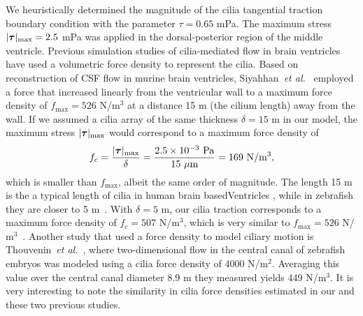 \documentclass{WileyMSP-template}
\begin{document}
We heuristically determined the magnitude of the cilia tangential traction boundary condition
with the parameter $\tau = 0.65$ mPa. The maximum stress $\vert\bm{\tau}\vert_{\mathrm{max}} = 2.5$ mPa
was applied in the dorsal-posterior region of the middle ventricle.
Previous simulation studies of cilia-mediated flow in brain ventricles have
used a volumetric force density to represent the cilia.
Based on reconstruction of CSF flow in murine brain ventricles,
Siyahhan~\emph{et al.}~\cite{Siyahhan2014FlowVentricles}
employed a force that increased linearly from the ventricular wall to a maximum force density of
$f_{\mathrm{max}} = 526$ N/$\mathrm{m^3}$ at a distance 15 \textmu m (the cilium length)
away from the wall. If we assumed a cilia array of the same thickness
$\delta = 15$ \textmu m in our model, the maximum stress $\vert\bm{\tau}\vert_{\mathrm{max}}$
would correspond to a maximum force density of 
\begin{equation*}
    f_c = \frac{\vert\bm{\tau}\vert_{\mathrm{max}}}{\delta}
        = \frac{\num{2.5e-3} \ \mathrm{Pa}}{15 \ \mu\mathrm{m}}
        = 169 \ \mathrm{N/m^3},
\end{equation*}
which is smaller than $f_{\mathrm{max}}$, albeit the same order of magnitude.
The length 15 \textmu m is the a typical length of cilia in human brain basedVentricles
\cite{Afzelius2004CiliaRelatedDiseases, Siyahhan2014FlowVentricles},
while in zebrafish they are closer to 5 \textmu m~\cite{Olstad2019CiliaryDevelopment,
Salman2022ComputationalEmbryo, Ringers2023NovelEpithelia}.
With $\delta=5$ \textmu m, our cilia traction corresponds to a maximum force density of
$f_c=507$ N/$\mathrm{m^3}$, which is very similar to
$f_{\mathrm{max}} = 526$ N/$\mathrm{m^3}$~\cite{Siyahhan2014FlowVentricles}.
Another study that used a force density to model ciliary motion is
Thouvenin~\emph{et al.}~\cite{Thouvenin2020OriginCanal}, where two-dimensional flow
in the central canal of zebrafish embryos was modeled using a cilia force density of
4000 N/$\mathrm{m^2}$. Averaging this value over the central canal diameter 8.9 \textmu m
they measured yields 449 N/$\mathrm{m^3}$. It is very interesting to note the similarity 
in cilia force densities estimated in our and these two previous studies. 

\end{document}

